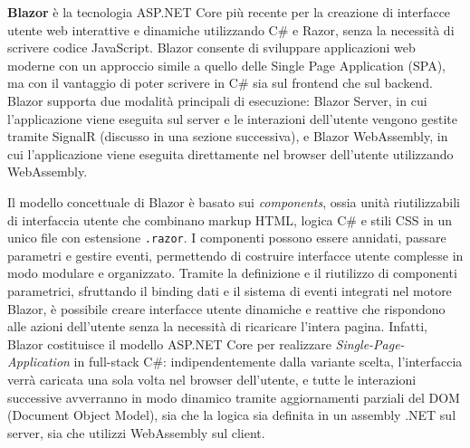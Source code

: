 \textbf{Blazor} è la tecnologia ASP.NET Core più recente per la creazione di interfacce utente web interattive e dinamiche utilizzando C\# e Razor, senza la necessità di scrivere codice JavaScript. Blazor consente di sviluppare applicazioni web moderne con un approccio simile a quello delle Single Page Application (SPA), ma con il vantaggio di poter scrivere in C\# sia sul frontend che sul backend.
Blazor supporta due modalità principali di esecuzione: Blazor Server, in cui l'applicazione viene eseguita sul server e le interazioni dell'utente vengono gestite tramite SignalR (discusso in una sezione successiva), e Blazor WebAssembly, in cui l'applicazione viene eseguita direttamente nel browser dell'utente utilizzando WebAssembly.

Il modello concettuale di Blazor è basato sui \emph{components}, ossia unità riutilizzabili di interfaccia utente che combinano markup HTML, logica C\# e stili CSS in un unico file con estensione \texttt{.razor}. I componenti possono essere annidati, passare parametri e gestire eventi, permettendo di costruire interfacce utente complesse in modo modulare e organizzato. Tramite la definizione e il riutilizzo di componenti parametrici, sfruttando il binding dati e il sistema di eventi integrati nel motore Blazor, è possibile creare interfacce utente dinamiche e reattive che rispondono alle azioni dell'utente senza la necessità di ricaricare l'intera pagina.
Infatti, Blazor costituisce il modello ASP.NET Core per realizzare \emph{Single-Page-Application} in full-stack C\#: indipendentemente dalla variante scelta, l'interfaccia verrà caricata una sola volta nel browser dell'utente, e tutte le interazioni successive avverranno in modo dinamico tramite aggiornamenti parziali del DOM (Document Object Model), sia che la logica sia definita in un assembly .NET sul server, sia che utilizzi WebAssembly sul client.

